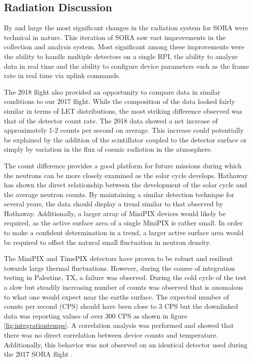 \subsection{Radiation Discussion}
\label{sec:Radiation Results Discussion}
By and large the most significant changes in the radiation system for SORA were technical in nature. This iteration of SORA saw vast improvements in the collection and analysis system. Most significant among these improvements were the ability to handle multiple detectors on a single RPI, the ability to analyze data in real time and the ability to configure device parameters such as the frame rate in real time via uplink commands.

The 2018 flight also provided an opportunity to compare data in similar conditions to our 2017 flight. While the composition of the data looked fairly similar in terms of LET distributions, the most striking difference observed was that of the detector count rate. The 2018 data showed a net increase of approximately 1-2 counts per second on average. This increase could potentially be explained by the addition of the scintillator coupled to the detector surface or simply by variation in the flux of cosmic radiation in the atmosphere.

The count difference provides a good platform for future missions during which the neutrons can be more closely examined as the solar cycle develops. Hathaway \cite{SolarCycle} has shown the direct relationship between the development of the solar cycle and the average neutron counts. By maintaining a similar detection technique for several years, the data should display a trend similar to that observed by Hathaway. Additionally, a larger array of MiniPIX devices would likely be required, as the active surface area of a single MiniPIX is rather small. In order to make a confident determination in a trend, a larger active surface area would be required to offset the natural small fluctuation in neutron density.

The MiniPIX and TimePIX detectors have proven to be robust and resilient towards large thermal fluctuations. However, during the course of integration testing in Palestine, TX, a failure was observed. During the cold cycle of the test a slow but steadily increasing number of counts was observed that is anomalous to what one would expect near the earths surface. The expected number of counts per second (CPS) should have been close to 3 CPS but the downlinked data was reporting values of over 300 CPS as shown in figure \ref{fig:integrationtemps}.
A correlation analysis was performed and showed that there was no direct correlation between device counts and temperature. Additionally, this behavior was not observed on an identical detector used during the 2017 SORA flight \cite{SORA}. 


